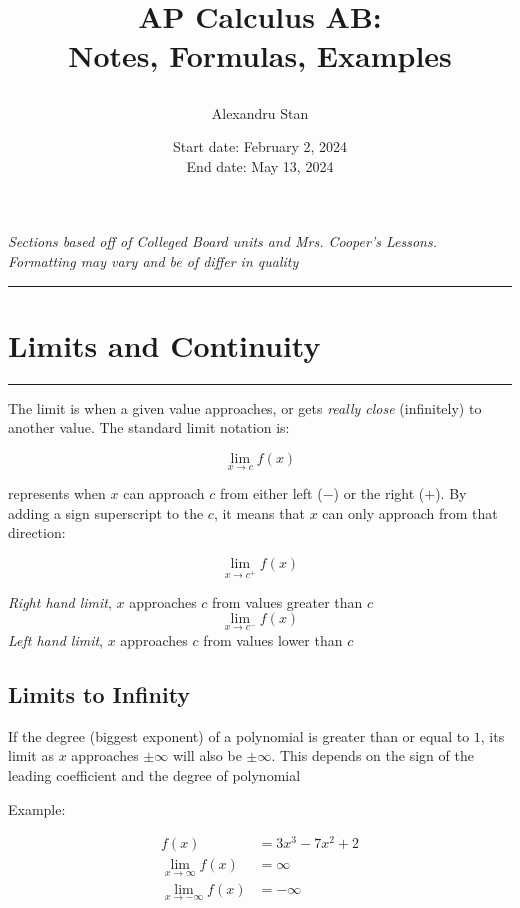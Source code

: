 \documentclass[12pt]{article}
\title{
    \textbf{AP Calculus AB:\\ Notes, Formulas, Examples}
    \author{Alexandru Stan}
    \date{Start date: February 2, 2024 \\ End date: May 13, 2024}
}
\newcommand{\fline}{\par\noindent\rule{\textwidth}{0.1pt}}
\newcommand{\uit}[1]{\textit{#1}}
\begin{document}
    \maketitle
    \vfill
    \begin{center}
        \uit{
            Sections based off of Colleged Board units and Mrs. Cooper's Lessons. \\
            Formatting may vary and be of differ in quality
        }
    \end{center}
    \newpage

    \tableofcontents
    \fline
    \newpage

    \section{Limits and Continuity}
    \fline

    The limit is when a given value approaches, or gets \textit{really close} (infinitely) to another value. 
    The standard limit notation is:

    \[
        \lim_{x \to c} f(x)    
    \]

    represents when $x$ can approach $c$ from either left ($-$) or the right ($+$). By adding
    a sign superscript to the $c$, it means that $x$ can only approach from that direction:

    \[
        \lim_{x \to c^+} f(x)    
    \]

    \begin{center}
        \uit{Right hand limit}, $x$ approaches $c$ from values greater than $c$
        \[
            \lim_{x \to c^-} f(x)    
        \]
        \uit{Left hand limit}, $x$ approaches $c$ from values lower than $c$
    \end{center}

    \subsection{Limits to Infinity}

    If the degree (biggest exponent) of a polynomial is greater than or equal to $1$, its
    limit as $x$ approaches $\pm\infty$ will also be $\pm\infty$. This depends on the sign of the leading
    coefficient and the degree of polynomial

    \noindent Example:

    \[
        \begin{aligned}
            f(x) &= 3x^3 - 7x^2 + 2 \\
            \lim_{x \to \infty} f(x) &= \infty \\
            \lim_{x \to -\infty} f(x) &= -\infty     
        \end{aligned}    
    \]
\end{document}
